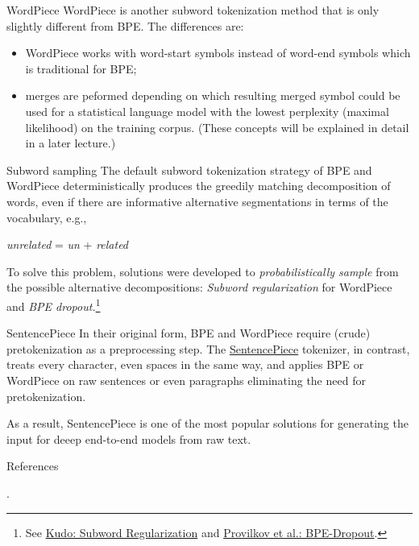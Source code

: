 \documentclass[style=upen, size=14pt]{powerdot}
\theoremstyle{definition}
\begin{document}
\begin{slide}[toc=WordPiece]{WordPiece}
  WordPiece is another subword tokenization method that is only slightly
  different from BPE. The differences are:
  \begin{itemize}
  \item WordPiece works with word-start symbols instead of word-end symbols which is
    traditional for BPE;
  \item merges are peformed depending on which resulting merged symbol could be
    used for a statistical language model with the lowest perplexity (maximal
    likelihood) on the training corpus. (These concepts will be explained in
    detail in a later lecture.)
  \end{itemize}
\end{slide}

\begin{slide}[toc=Subword sampling]{Subword sampling}
  The default subword tokenization strategy of BPE and WordPiece
  deterministically produces the greedily matching decomposition of words, even
  if there are informative alternative segmentations in terms of the vocabulary,
  e.g.,
  \begin{center}
    \emph{unrelated} = \emph{un} + \emph{related}
  \end{center}
  To solve this problem, solutions were developed to \emph{probabilistically
    sample} from the possible alternative decompositions: \emph{Subword
    regularization} for WordPiece and \emph{BPE dropout.}\footnote{See \href{https://arxiv.org/pdf/1804.10959.pdf}{Kudo: Subword Regularization} and \href{https://arxiv.org/pdf/1910.13267.pdf}{Provilkov et al.: BPE-Dropout}.}
\end{slide}

\begin{slide}[toc=SentencePiece]{SentencePiece}
  In their original form, BPE and WordPiece require (crude) pretokenization as a
  preprocessing step. The
  \href{https://github.com/google/sentencepiece}{SentencePiece} tokenizer, in
  contrast, treats every character, even spaces in the same way, and applies BPE
  or WordPiece on raw sentences or even paragraphs eliminating the need for
  pretokenization.

  As a result, SentencePiece is one of the most popular solutions for generating
  the input for deeep end-to-end models from raw text.
\end{slide}

\begin{slide}{References}
  
  \begin{footnotesize}

    .\medskip

  \end{footnotesize}
\end{slide}
\end{document}
